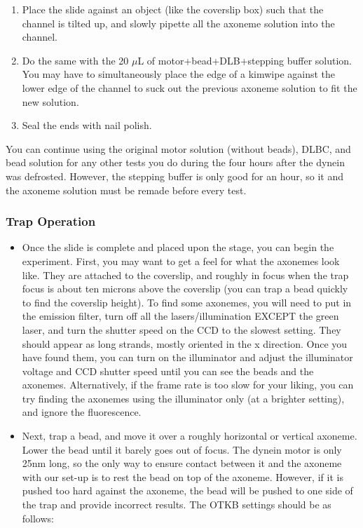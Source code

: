 \documentclass{../lab}
\begin{document}
\begin{enumerate}
    \item Place the slide against an object (like the coverslip box) such that the channel is tilted up, and slowly pipette all the axoneme solution into the channel.

    \item Do the same with the 20 $\mu$L of motor+bead+DLB+stepping buffer solution. You may have to simultaneously place the edge of a kimwipe against the lower edge of the channel to suck out the previous axoneme solution to fit the new solution.

    \item Seal the ends with nail polish.
\end{enumerate}

You can continue using the original motor solution (without beads), DLBC, and bead solution for any other tests you do during the four hours after the dynein was defrosted. However, the stepping buffer is only good for an hour, so it and the axoneme solution must be remade before every test.

\subsubsection{Trap Operation}

\begin{itemize}
    \item Once the slide is complete and placed upon the stage, you can begin the experiment. First, you may want to get a feel for what the axonemes look like. They are attached to the coverslip, and roughly in focus when the trap focus is about ten microns above the coverslip (you can trap a bead quickly to find the coverslip height). To find some axonemes, you will need to put in the emission filter, turn off all the lasers/illumination EXCEPT the green laser, and turn the shutter speed on the CCD to the slowest setting. They should appear as long strands, mostly oriented in the x direction. Once you have found them, you can turn on the illuminator and adjust the illuminator voltage and CCD shutter speed until you can see the beads and the axonemes. Alternatively, if the frame rate is too slow for your liking, you can try finding the axonemes using the illuminator only (at a brighter setting), and ignore the fluorescence.

\end{itemize}

\begin{itemize}
    \item Next, trap a bead, and move it over a roughly horizontal or vertical axoneme. Lower the bead until it barely goes out of focus. The dynein motor is only 25nm long, so the only way to ensure contact between it and the axoneme with our set-up is to rest the bead on top of the axoneme. However, if it is pushed too hard against the axoneme, the bead will be pushed to one side of the trap and provide incorrect results. The OTKB settings should be as follows:

\end{itemize}
\end{document}
